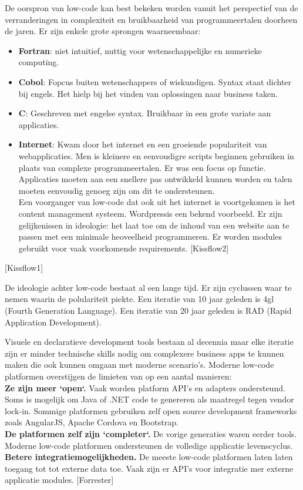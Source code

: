 De oorspron van low-code kan best bekeken worden vanuit het perspectief van de verranderingen in complexiteit en bruikbaarheid van programmeertalen doorheen de jaren. Er zijn enkele grote sprongen waarneembaar:
\begin{itemize}
    \item \textbf{Fortran}: niet intuitief, nuttig voor wetenschappelijke en numerieke computing.
    \item \textbf{Cobol}: Fopcus buiten wetenschappers of wiskundigen. Syntax staat dichter bij engels. Het hielp bij het vinden van oplossingen naar business taken.
    \item \textbf{C}: Geschreven met engelse syntax. Bruikbaar in een grote variate aan applicaties.
    \item \textbf{Internet}: Kwam door het internet en een groeiende populariteit van webapplicaties. Men is kleinere en eenvoudigre scripts beginnen gebruiken in plaats van complexe programmeertalen. Er was een focus op functie. Applicaties moeten aan een snellere pas ontwikkeld kunnen worden en talen moeten eenvoudig genoeg zijn om dit te ondersteunen.\\
    Een voorganger van low-code dat ook uit het internet is voortgekomen is het content management systeem. Wordpressis een bekend voorbeeld. Er zijn gelijkenissen in ideologie: het laat toe om de inhoud van een website aan te passen met een minimale heoveelheid programmeren. Er worden modules gebruikt voor vaak voorkomende requirements. [Kissflow2]
\end{itemize} [Kissflow1]

De ideologie achter low-code bestaat al een lange tijd. Er zijn cyclussen waar te nemen waarin de polulariteit piekte. Een iteratie van 10 jaar geleden is 4gl (Fourth Generation Language). Een iteratie van 20 jaar geleden is RAD (Rapid Application Development).

Visuele en declaratieve development tools bestaan al decennia maar elke iteratie zijn er minder technische skills nodig om complexere business apps te kunnen maken die ook kunnen omgaan met moderne scenario's. Moderne low-code platformen overstijgen de limieten van op een aantal manieren: \\
\textbf{Ze zijn meer `open`.} Vaak worden platform API's en adapters ondersteund. Soms is mogelijk om Java of .NET code te genereren als maatregel tegen vendor lock-in. Sommige platformen gebruiken zelf open source development frameworks zoals AngularJS, Apache Cordova en Bootstrap.\\
\textbf{De platformen zelf zijn `completer`.} De vorige generaties waren eerder tools. Moderne low-code platformen ondersteunen de volledige applicatie levenscyclus.\\
\textbf{Betere integratiemogelijkheden.} De meeste low-code platformen laten laten toegang tot tot externe data toe. Vaak zijn er API's voor integratie mer externe applicatie modules. [Forrester]

